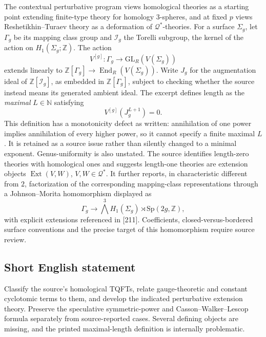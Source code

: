 \documentclass[11pt]{article}
\newcommand{\N}{\mathbb{N}}
\newcommand{\Z}{\mathbb{Z}}
\begin{document}
The contextual perturbative program views homological theories as a starting point extending finite-type theory for homology \(3\)-spheres, and at fixed \(p\) views Reshetikhin--Turaev theory as a deformation of \(\mathcal Q^*\)-theories. For a surface \(\Sigma_g\), let \(\Gamma_g\) be its mapping class group and \(\mathcal I_g\) the Torelli subgroup, the kernel of the action on \(H_1(\Sigma_g;\Z)\). The action
\[
 V^{[g]}:\Gamma_g\to\mathrm{GL}_R(V(\Sigma_g))
\]
extends linearly to \(\Z[\Gamma_g]\to\operatorname{End}_R(V(\Sigma_g))\). Write \(J_g\) for the augmentation ideal of \(\Z[\mathcal I_g]\), as embedded in \(\Z[\Gamma_g]\), subject to checking whether the source instead means its generated ambient ideal. The excerpt defines length as the \emph{maximal} \(L\in\N\) satisfying
\[
 V^{[g]}(J_g^{L+1})=0.
\]
This definition has a monotonicity defect as written: annihilation of one power implies annihilation of every higher power, so it cannot specify a finite maximal \(L\). It is retained as a source issue rather than silently changed to a minimal exponent. Genus-uniformity is also unstated. The source identifies length-zero theories with homological ones and suggests length-one theories are extension objects \(\operatorname{Ext}(V,W)\), \(V,W\in\mathcal Q^*\). It further reports, in characteristic different from \(2\), factorization of the corresponding mapping-class representations through a Johnson--Morita homomorphism displayed as
\[
 \Gamma_g\longrightarrow
 \bigwedge^3 H_1(\Sigma_g)\rtimes\mathrm{Sp}(2g,\Z),
\]
with explicit extensions referenced in [211]. Coefficients, closed-versus-bordered surface conventions and the precise target of this homomorphism require source review.
\subsection{Short English statement}
Classify the source's homological TQFTs, relate gauge-theoretic and constant cyclotomic terms to them, and develop the indicated perturbative extension theory. Preserve the speculative symmetric-power and Casson--Walker--Lescop formula separately from source-reported cases. Several defining objects are missing, and the printed maximal-length definition is internally problematic.
\end{document}
